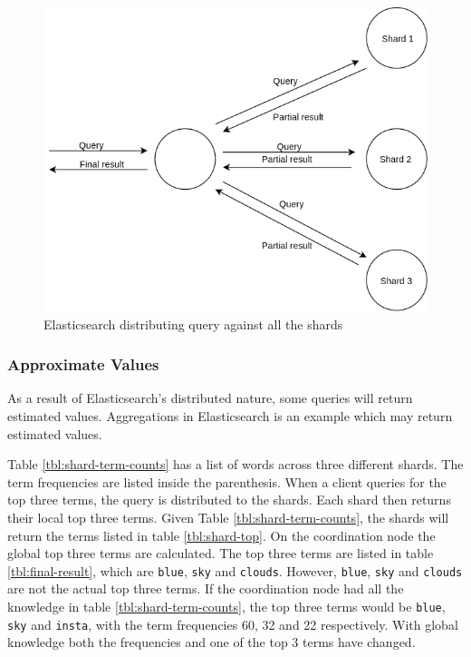\begin{figure}[h]
  \centering
  \includegraphics[width=0.9\linewidth]{img/elasticsearch-sharding.png}
  \caption{Elasticsearch distributing query against all the shards}
  \label{fig:elasticsearch-sharding}
\end{figure}

\subsubsection{Approximate Values}
As a result of Elasticsearch's distributed nature, some queries will return estimated values.
Aggregations in Elasticsearch is an example which may return estimated values.

Table \ref{tbl:shard-term-counts} has a list of words across three different shards.
The term frequencies are listed inside the parenthesis.
When a client queries for the top three terms, the query is distributed to the shards.
Each shard then returns their local top three terms.
Given Table \ref{tbl:shard-term-counts},
the shards will return the terms listed in table \ref{tbl:shard-top}.
On the coordination node the global top three terms are calculated.
The top three terms are listed in table \ref{tbl:final-result}, which are \texttt{blue}, \texttt{sky} and \texttt{clouds}.
However, \texttt{blue}, \texttt{sky} and \texttt{clouds} are not the actual top three terms.
If the coordination node had all the knowledge in table \ref{tbl:shard-term-counts},
the top three terms would be \texttt{blue}, \texttt{sky} and \texttt{insta},
with the term frequencies 60, 32 and 22 respectively.
With global knowledge both the frequencies and one of the top 3 terms have changed.

